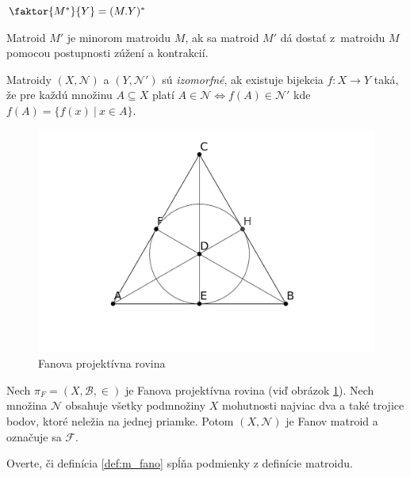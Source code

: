 \begin{theorem_hard}
$\faktor{M^*}{Y}  = (M.Y)^*$
\end{theorem_hard}

\begin{definition}
Matroid $M'$ je minorom matroidu $M$, ak sa matroid $M'$ dá dostať z~matroidu $M$ pomocou postupnosti zúžení a kontrakcií.
\end{definition}

\begin{definition}
Matroidy $(X, \mathcal{N})$ a $(Y, \mathcal{N}')$ sú \textit{izomorfné}, ak existuje bijekcia $f:X\rightarrow Y$ taká, že pre každú množinu $A \subseteq X$ platí $A\in\mathcal{N}\Leftrightarrow f(A)\in\mathcal{N}'$ kde $f(A) = \{f(x)~|~ x \in A\}$.
\end{definition}

\begin{figure}
    \centering
    \includegraphics[scale=0.3]{fano2.pdf}
    \caption{Fanova projektívna rovina}
    \label{fig:fano_fpp}
\end{figure}


\begin{definition}
\label{def:m_fano}
Nech $\pi_F = (X, \mathcal{B}, \in)$ je Fanova projektívna rovina (viď obrázok \ref{fig:fano_fpp}).
Nech množina $\mathcal{N}$ obsahuje všetky podmnožiny $X$ mohutnosti najviac dva a také trojice bodov, ktoré neležia na jednej priamke.
Potom $(X, \mathcal{N})$ je Fanov matroid a označuje sa $\mathcal{F}$.
\end{definition}

\begin{exercise}
Overte, či definícia \ref{def:m_fano} spĺňa podmienky z definície matroidu.
\end{exercise}


